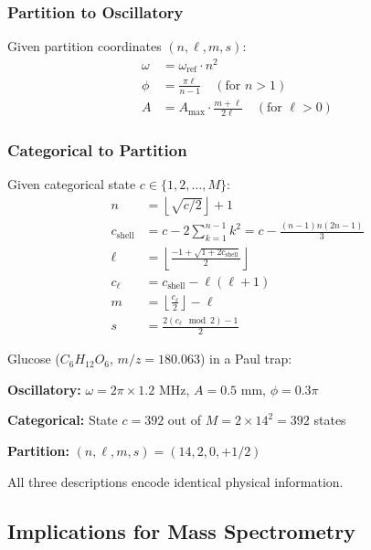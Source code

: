 \subsubsection{Partition to Oscillatory}

Given partition coordinates $(n, \ell, m, s)$:
\begin{align}
\omega &= \omega_{\mathrm{ref}} \cdot n^2 \\
\phi &= \frac{\pi \ell}{n-1} \quad (\text{for } n > 1) \\
A &= A_{\max} \cdot \frac{m + \ell}{2\ell} \quad (\text{for } \ell > 0)
\end{align}

\subsubsection{Categorical to Partition}

Given categorical state $c \in \{1, 2, \ldots, M\}$:
\begin{align}
n &= \left\lfloor \sqrt{c/2} \right\rfloor + 1 \\
c_{\mathrm{shell}} &= c - 2\sum_{k=1}^{n-1} k^2 = c - \frac{(n-1)n(2n-1)}{3} \\
\ell &= \left\lfloor \frac{-1 + \sqrt{1 + 2c_{\mathrm{shell}}}}{2} \right\rfloor \\
c_{\ell} &= c_{\mathrm{shell}} - \ell(\ell+1) \\
m &= \left\lfloor \frac{c_{\ell}}{2} \right\rfloor - \ell \\
s &= \frac{2(c_{\ell} \mod 2) - 1}{2}
\end{align}

\begin{example}
\label{ex:glucose_triple}
Glucose ($C_6H_{12}O_6$, $m/z = 180.063$) in a Paul trap:

\textbf{Oscillatory:} $\omega = 2\pi \times 1.2$ MHz, $A = 0.5$ mm, $\phi = 0.3\pi$

\textbf{Categorical:} State $c = 392$ out of $M = 2 \times 14^2 = 392$ states

\textbf{Partition:} $(n, \ell, m, s) = (14, 2, 0, +1/2)$

All three descriptions encode identical physical information.
\end{example}

\subsection{Implications for Mass Spectrometry}


